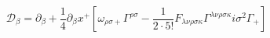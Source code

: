 \begin{equation}
\mathcal{D}_\beta = \partial_\beta + \frac{1}{4} \partial_{\beta} x^+
 \left[    \omega_{\rho \sigma +} \Gamma^{\rho \sigma} 
         - \frac{1}{2 \cdot 5!} F_{\lambda \nu \rho \sigma \kappa}
          \Gamma^{\lambda \nu \rho \sigma \kappa} i\sigma^2 \Gamma_+   \right]
\end{equation}

